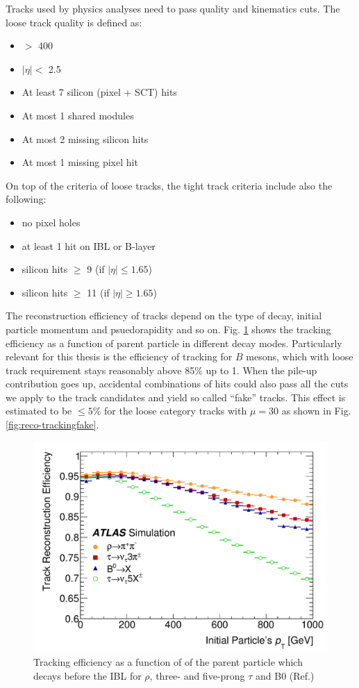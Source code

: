 Tracks used by physics analyses need to pass quality and kinematics cuts. The loose track quality is defined as:

\begin{itemize}
\item \pT $>$ 400 \mev
\item $|\eta| < $ 2.5
\item At least 7 silicon (pixel + SCT) hits
\item At most 1 shared modules
\item At most 2 missing silicon hits
\item At most 1 missing pixel hit
\end{itemize}

On top of the criteria of loose tracks, the tight track criteria include also the following:

\begin{itemize}
\item no pixel holes
\item at least 1 hit on IBL or B-layer
\item silicon hits $\geq$ 9 (if $|\eta|\leq 1.65$)
\item silicon hits $\geq$ 11 (if $|\eta|\geq 1.65$)
\end{itemize}

The reconstruction efficiency of tracks depend on the type of decay, initial particle momentum and psuedorapidity and so on. Fig. \ref{fig:reco-trackingeff} shows the tracking efficiency as a function of parent particle \pt in different decay modes. Particularly relevant for this thesis is the efficiency of tracking for $B$ mesons, which with loose track requirement stays reasonably above 85\% up to 1\TeV. When the pile-up contribution goes up, accidental combinations of hits could also pass all the cuts we apply to the track candidates and yield so called ``fake'' tracks. This effect is estimated to be $\leq 5\%$ for the loose category tracks with $\mu = 30$ as shown in Fig.\ref{fig:reco-trackingfake}.


\begin{figure}[htpb!]
\begin{center}
  \includegraphics[width=0.55\linewidth]{figures/Reco/TrackingEfficiency}
  \caption{Tracking efficiency as a function of \pt of the parent particle which decays before the IBL for $\rho$, three- and five-prong $\tau$ and B0 (Ref.\cite{Aaboud:2017all})}
\label{fig:reco-trackingeff}
\end{center}
\end{figure}

